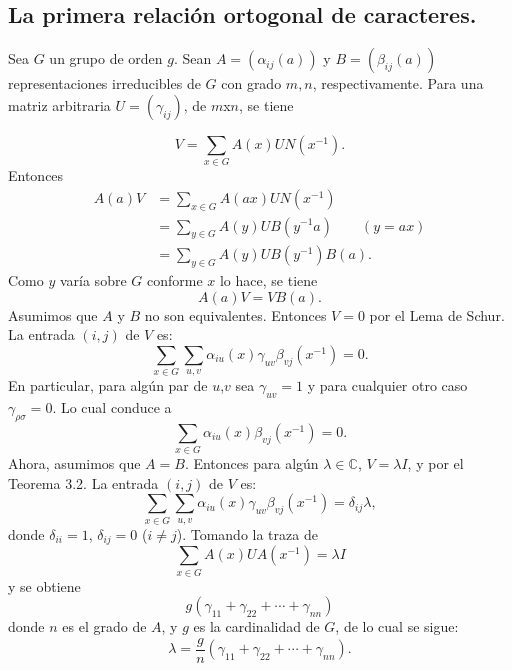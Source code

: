 \documentclass[12pt]{book}
\theoremstyle{definition}
\newcounter{in}
\begin{document}
\subsection{La primera relación ortogonal de caracteres.}
\label{subsec:roc1}
Sea $G$ un grupo de orden $g$. Sean $A=(\alpha_{ij}(a))$ y
$B=(\beta_{ij}(a))$ representaciones irreducibles de $G$ con grado
$m,n$, respectivamente. Para una matriz arbitraria $U=(\gamma_{ij})$,
de $m$x$n$, se tiene

\begin{equation}
  \label{eq:22}
  V=\sum_{x \in G} A(x)UN(x^{-1}).  
\end{equation}
Entonces
\begin{equation}
  \label{eq:23}
  \begin{aligned}
    A(a)V &=\sum_{x \in G} A(ax)UN(x^{-1})\\
    &=\sum_{y \in G} A(y)UB(y^{-1}a) \qquad (y=ax)\\
    &=\sum_{y \in G} A(y)UB(y^{-1})B(a).
  \end{aligned}
\end{equation}
Como $y$ varía sobre $G$ conforme $x$ lo hace, se tiene
\begin{equation}
  \label{eq:24}
  A(a)V=VB(a).
\end{equation} 
Asumimos que $A$ y $B$ no son equivalentes. Entonces $V=0$ por el Lema
de Schur. La entrada $(i,j)$ de $V$ es:
\begin{equation}
  \label{eq:25}
  \sum_{x \in G} \sum_{u,v} \alpha_{iu}(x) \gamma_{uv} \beta_{vj}(x^{-1}) = 0.
\end{equation}
En particular, para algún par de $u$,$v$ sea $\gamma_{uv}=1$ y para
cualquier otro caso $\gamma_{\rho \sigma}=0$. Lo cual conduce a
\begin{equation}
  \label{eq:26}
  \sum_{x \in G} \alpha_{iu}(x) \beta_{vj}(x^{-1}) = 0.
\end{equation}
Ahora, asumimos que $A=B$. Entonces para algún
$\lambda \in \mathbb{C}$, $V=\lambda I$, y por el Teorema 3.2. La
entrada $(i,j)$ de $V$ es:
\begin{equation}
  \label{eq:27}
   \sum_{x \in G} \sum_{u,v} \alpha_{iu}(x) \gamma_{uv} \beta_{vj}(x^{-1}) = \delta_{ij}\lambda,
\end{equation}
donde $\delta_{ii}=1$, $\delta_{ij}=0$ ($i \neq j$). Tomando la traza de
\begin{equation}
  \label{eq:28}
  \sum_{x \in G} A(x)UA(x^{-1}) = \lambda I
\end{equation}
y se obtiene
\begin{equation}
  \label{eq:29}
  g(\gamma_{11}+\gamma_{22}+ \cdots +\gamma_{nn})
\end{equation}
donde $n$ es el grado de $A$, y $g$ es la cardinalidad de $G$, de lo cual se sigue:
\begin{equation}
  \label{eq:30}
  \lambda=\frac{g}{n}(\gamma_{11}+\gamma_{22}+ \cdots + \gamma_{nn}).
\end{equation}
\end{document}
